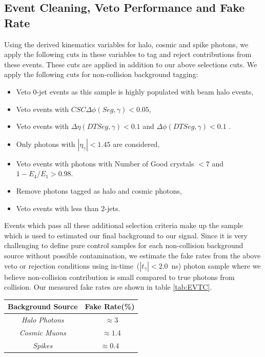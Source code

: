 \subsection{Event Cleaning, Veto Performance and Fake Rate}
Using the derived kinematics variables for halo, cosmic and spike photons, we apply the following cuts in these variables to tag and reject contributions from these events. These cuts are applied in addition to our above selections cuts. We apply the following cuts for non-collision background tagging:
\begin{itemize}
\item Veto 0-jet events as this sample is highly populated with beam halo events, 
\item Veto events with $CSC\Delta\phi(Seg,\gamma) < 0.05$,
\item Veto events with $\Delta\eta(DT Seg,\gamma) < 0.1$ and $\Delta\phi(DT Seg,\gamma) < 0.1$ .
\item Only photons with $|\eta_{\gamma}| < 1.45$ are considered,
\item Veto events with photons with Number of Good crystals $ < 7$ and $ 1-E_{4}/E_{1} > 0.98$.
\item Remove photons tagged as halo and cosmic photons,
\item Veto events with less than $2$-jets.
\end{itemize}
Events which pass all these additional selection criteria make up the sample which is used to estimated our final background to our signal.
Since it is very challenging to define pure control samples for each non-collision background source without possible contamination, we estimate the fake rates from the above veto or rejection conditions using in-time~($|t_{\gamma}| < 2.0$~ns) photon sample where we believe non-collision contribution is small compared to true photons from collision.
Our measured fake rates are shown in table \ref{tab:EVTC}.
\begin{center}
\centering
\begin{tabular}{|c| c|}
\hline
\bfseries{Background Source} & \bfseries {Fake Rate}(\%)\\
\hline\hline
\textit{Halo Photons} & ~$\approx 3$ \\
\textit{Cosmic Muons} & ~$\approx 1.4$ \\
\textit{Spikes} & $\approx 0.4$ \\
\hline
\end{tabular}
\label{tab:EVTC} 
\end{center}

